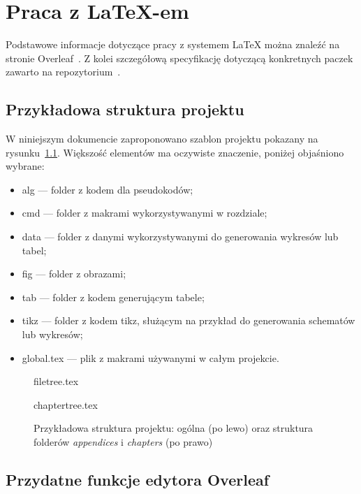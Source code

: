 \chapter{Praca z \LaTeX{}-em}
\label{chap:latex}

Podstawowe informacje dotyczące pracy z systemem \LaTeX{} można znaleźć na stronie Overleaf~\cite{Overleaf}. Z kolei szczegółową specyfikację dotyczącą konkretnych paczek zawarto na repozytorium~\cite{WinNT}.

\section{Przykładowa struktura projektu}

W niniejszym dokumencie zaproponowano szablon projektu pokazany na rysunku~\ref{fig:projectSchema}. Większość elementów ma oczywiste znaczenie, poniżej objaśniono wybrane:
\begin{itemize}
    \item alg --- folder z kodem dla pseudokodów;
    \item cmd --- folder z makrami wykorzystywanymi w rozdziale;
    \item data --- folder z danymi wykorzystywanymi do generowania wykresów lub tabel;
    \item fig --- folder z obrazami;
    \item tab --- folder z kodem generującym tabele;
    \item tikz --- folder z kodem tikz, służącym na przykład do generowania schematów lub wykresów;
    \item global.tex --- plik z makrami używanymi w całym projekcie.
\end{itemize}

\begin{figure}[t]
    \centering
    \begin{minipage}{0.45\textwidth}
        {filetree.tex}
    \end{minipage}
    \begin{minipage}{0.45\textwidth}
        {chaptertree.tex}
    \end{minipage}
    \caption{Przykładowa struktura projektu: ogólna (po lewo) oraz struktura folderów \textit{appendices} i \textit{chapters} (po prawo)}
    \label{fig:projectSchema}
\end{figure}

\section{Przydatne funkcje edytora Overleaf}


